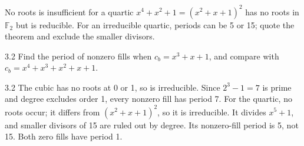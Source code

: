 \documentclass[11pt,a4paper]{article}
\newcommand{\F}{\mathbb F}\newcommand{\Z}{\mathbb Z}
\begin{document}
\begin{tip}{No roots is insufficient for a quartic}
\(x^4+x^2+1=(x^2+x+1)^2\) has no roots in \(\F_2\) but is reducible. For an irreducible quartic, periods can be 5 or 15; quote the theorem and exclude the smaller divisors.
\end{tip}
\begin{question}{3.2}
Find the period of nonzero fills when \(c_b=x^3+x+1\), and compare with \(c_b=x^4+x^3+x^2+x+1\).
\end{question}
\begin{answer}{3.2}
The cubic has no roots at 0 or 1, so is irreducible. Since \(2^3-1=7\) is prime and degree excludes order 1, every nonzero fill has period 7. For the quartic, no roots occur; it differs from \((x^2+x+1)^2\), so it is irreducible. It divides \(x^5+1\), and smaller divisors of 15 are ruled out by degree. Its nonzero-fill period is 5, not 15. Both zero fills have period 1.
\end{answer}
\end{document}
